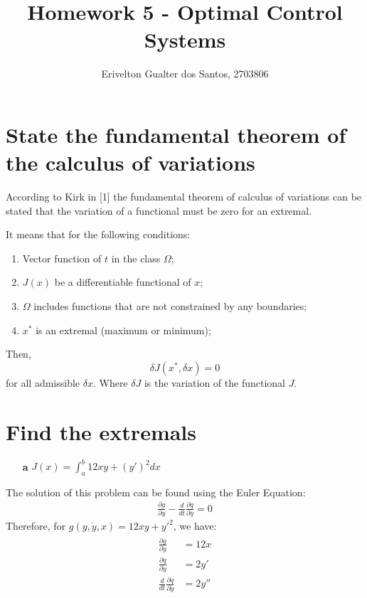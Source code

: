 \documentclass{article}
\begin{document}
\title{Homework 5 - Optimal Control Systems}
\author{Erivelton Gualter dos Santos, 2703806}
\date{}

\maketitle 

\section{State the fundamental theorem of the calculus of variations}

According to Kirk in [1] the fundamental theorem of calculus of variations can be stated that the variation of a functional must be zero for an extremal. 

It means that for the following conditions:
\begin{enumerate}
\item Vector function of $t$ in the class $\Omega$;
\item $J(x)$ be a differentiable functional of $x$;
\item $\Omega$ includes functions that are not constrained by
any boundaries;
\item $x^*$ is an extremal (maximum or minimum);
\end{enumerate} 
Then,
\begin{equation}
\delta J(x^*,\delta x) = 0
\end{equation}
for all admissible $\delta x$. Where $\delta J$ is the variation of the functional $J$.


\section{Find the extremals}

\begin{enumerate}
\item[\textbf{a}] $ J(x) = \int_{a}^{b} 12xy + (y')^2 dx $  
\end{enumerate}

The solution of this problem can be found using the Euler Equation:
\begin{eqnarray}
\frac{\partial g}{\partial y} - \frac{d}{dt}\frac{\partial q}{\partial \dot{y}} = 0
\end{eqnarray}
Therefore, for $g(y,\dot{y}, x) = 12xy+y'^2 $, we have:
\begin{eqnarray*}
\begin{split}
\frac{\partial g}{\partial y} &= 12x \\
\frac{\partial q}{\partial \dot{y}} &= 2y'\\
\frac{d}{dt}\frac{\partial q}{\partial \dot{y}} &= 2y''
\end{split}
\end{eqnarray*}
\end{document}
